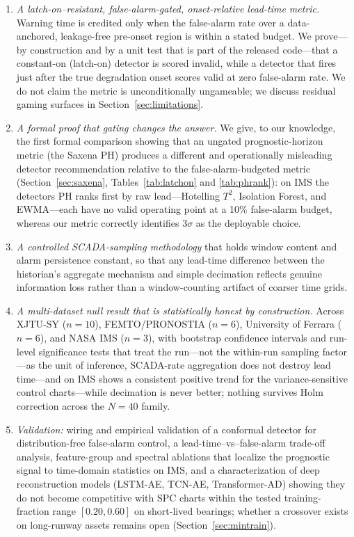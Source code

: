 \documentclass[IJPHM, 2026, 0]{PHMSociety}
\begin{document}
\begin{enumerate}
\item \emph{A latch-on--resistant, false-alarm-gated, onset-relative lead-time metric.} Warning time is credited only when the false-alarm rate over a data-anchored, leakage-free pre-onset region is within a stated budget. We prove---by construction and by a unit test that is part of the released code---that a constant-on (latch-on) detector is scored invalid, while a detector that fires just after the true degradation onset scores valid at zero false-alarm rate. We do not claim the metric is unconditionally ungameable; we discuss residual gaming surfaces in Section~\ref{sec:limitations}.
\item \emph{A formal proof that gating changes the answer.} We give, to our knowledge, the first formal comparison showing that an ungated prognostic-horizon metric (the Saxena PH) produces a different and operationally misleading detector recommendation relative to the false-alarm-budgeted metric (Section~\ref{sec:saxena}, Tables~\ref{tab:latchon} and \ref{tab:phrank}): on IMS the detectors PH ranks first by raw lead---Hotelling $T^2$, Isolation Forest, and EWMA---each have no valid operating point at a 10\% false-alarm budget, whereas our metric correctly identifies $3\sigma$ as the deployable choice.
\item \emph{A controlled SCADA-sampling methodology} that holds window content and alarm persistence constant, so that any lead-time difference between the historian's aggregate mechanism and simple decimation reflects genuine information loss rather than a window-counting artifact of coarser time grids.
\item \emph{A multi-dataset null result that is statistically honest by construction.} Across XJTU-SY ($n=10$), FEMTO/PRONOSTIA ($n=6$), University of Ferrara ($n=6$), and NASA IMS ($n=3$), with bootstrap confidence intervals and run-level significance tests that treat the run---not the within-run sampling factor---as the unit of inference, SCADA-rate aggregation does not destroy lead time---and on IMS shows a consistent positive trend for the variance-sensitive control charts---while decimation is never better; nothing survives Holm correction across the $N=40$ family.
\item \emph{Validation:} wiring and empirical validation of a conformal detector for distribution-free false-alarm control, a lead-time--vs--false-alarm trade-off analysis, feature-group and spectral ablations that localize the prognostic signal to time-domain statistics on IMS, and a characterization of deep reconstruction models (LSTM-AE, TCN-AE, Transformer-AD) showing they do not become competitive with SPC charts within the tested training-fraction range $[0.20, 0.60]$ on short-lived bearings; whether a crossover exists on long-runway assets remains open (Section~\ref{sec:mintrain}).
\end{enumerate}
\end{document}
